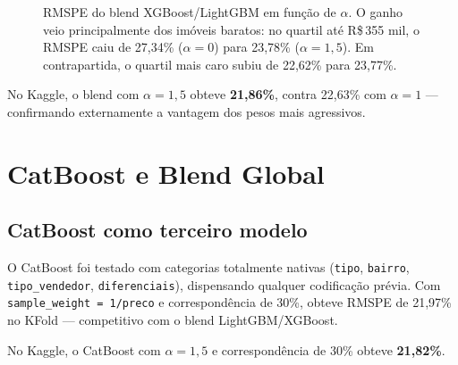\documentclass[12pt,a4paper]{article}
\begin{document}
\begin{figure}[h]
\centering
{}
\caption{RMSPE do blend XGBoost/LightGBM em função de $\alpha$. O ganho veio principalmente dos imóveis baratos: no quartil até R\$\,355 mil, o RMSPE caiu de 27,34\% ($\alpha=0$) para 23,78\% ($\alpha=1{,}5$). Em contrapartida, o quartil mais caro subiu de 22,62\% para 23,77\%.}
\label{fig:sample_weights}
\end{figure}

No Kaggle, o blend com $\alpha=1{,}5$ obteve \textbf{21,86\%}, contra 22,63\% com $\alpha=1$ --- confirmando externamente a vantagem dos pesos mais agressivos.

\section{CatBoost e Blend Global}

\subsection{CatBoost como terceiro modelo}

O CatBoost foi testado com categorias totalmente nativas (\texttt{tipo}, \texttt{bairro}, \texttt{tipo\_vendedor}, \texttt{diferenciais}), dispensando qualquer codificação prévia. Com \lstinline{sample_weight = 1/preco} e correspondência de 30\%, obteve RMSPE de 21,97\% no KFold --- competitivo com o blend LightGBM/XGBoost.

No Kaggle, o CatBoost com $\alpha=1{,}5$ e correspondência de 30\% obteve \textbf{21,82\%}.
\end{document}

